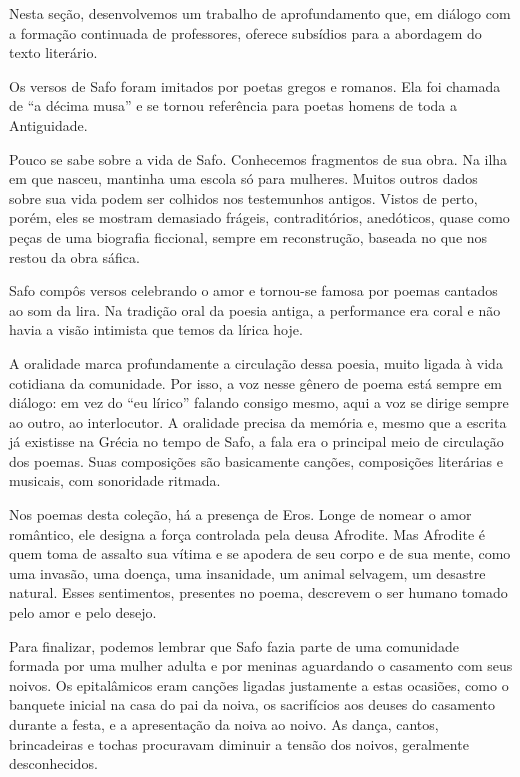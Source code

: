 \documentclass[12pt]{extarticle}
\begin{document}
Nesta seção, desenvolvemos um trabalho de aprofundamento que, em diálogo
com a formação continuada de professores, oferece subsídios para a
abordagem do texto literário.

Os versos de Safo foram imitados por poetas gregos e romanos. Ela foi
chamada de ``a décima musa'' e se tornou referência para poetas homens
de toda a Antiguidade.

Pouco se sabe sobre a vida de Safo. Conhecemos fragmentos de sua obra.
Na ilha em que nasceu, mantinha uma escola só para mulheres. Muitos outros 
dados sobre sua vida podem ser colhidos nos testemunhos antigos. 
Vistos de perto, porém, eles se mostram demasiado frágeis,
contraditórios, anedóticos, quase como peças de uma biografia ficcional,
sempre em reconstrução, baseada no que nos restou da obra sáfica.

Safo compôs versos celebrando o amor e tornou-se famosa por poemas
cantados ao som da lira. Na tradição oral da poesia antiga, a
performance era coral e não havia a visão intimista que temos da lírica
hoje.

A oralidade marca profundamente a circulação dessa poesia, muito ligada
à vida cotidiana da comunidade. Por isso, a voz nesse gênero de poema 
está sempre em diálogo: em vez do ``eu lírico'' falando consigo mesmo, 
aqui a voz se dirige sempre ao outro, ao interlocutor. A oralidade precisa 
da memória e, mesmo que a escrita já existisse na Grécia no tempo de Safo, 
a fala era o principal meio de circulação dos poemas. Suas composições são 
basicamente canções, composições literárias e musicais, com sonoridade ritmada. 

Nos poemas desta coleção, há a presença de Eros. Longe de nomear o amor
romântico, ele designa a força controlada pela deusa Afrodite. Mas Afrodite 
é quem toma de assalto sua vítima e se apodera de seu corpo e de sua
mente, como uma invasão, uma doença, uma insanidade, um animal
selvagem, um desastre natural. Esses sentimentos, presentes no poema, 
descrevem o ser humano tomado pelo amor e pelo desejo.


Para finalizar, podemos lembrar que Safo fazia parte de uma comunidade 
formada por uma mulher adulta e por meninas aguardando o casamento com
seus noivos. Os epitalâmicos eram canções ligadas justamente a estas ocasiões,
como o banquete inicial na casa do pai da noiva, os sacrifícios aos deuses do casamento 
durante a festa, e a apresentação da noiva ao noivo. As dança, cantos, brincadeiras
e tochas procuravam diminuir a tensão dos noivos, geralmente desconhecidos.
\end{document}
